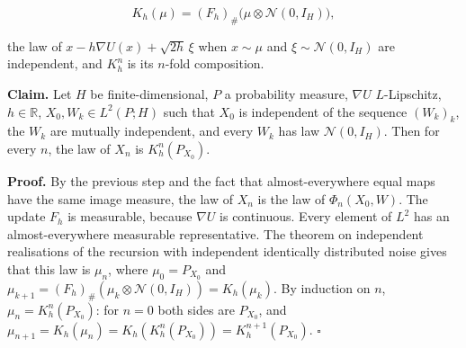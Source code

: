 \documentclass[11pt,a4paper]{article}
\begin{document}
\[K_h(\mu)=(F_h)_\#\bigl(\mu\otimes\mathcal N(0,I_H)\bigr),\]


the law of \(x-h\nabla U(x)+\sqrt{2h}\,\xi\) when \(x\sim\mu\) and \(\xi\sim\mathcal N(0,I_H)\) are independent, and \(K_h^n\) is its \(n\)-fold composition.




\textbf{Claim.} Let \(H\) be finite-dimensional, \(P\) a probability measure, \(\nabla U\) \(L\)-Lipschitz, \(h\in\mathbb R\), \(X_0,W_k\in L^2(P;H)\) such that \(X_0\) is independent of the sequence \((W_k)_k\), the \(W_k\) are mutually independent, and every \(W_k\) has law \(\mathcal N(0,I_H)\). Then for every \(n\), the law of \(X_n\) is \(K_h^n(P_{X_0})\).




\textbf{Proof.} By the previous step and the fact that almost-everywhere equal maps have the same image measure, the law of \(X_n\) is the law of \(\Phi_n(X_0,W)\). The update \(F_h\) is measurable, because \(\nabla U\) is continuous. Every element of \(L^2\) has an almost-everywhere measurable representative. The theorem on independent realisations of the recursion with independent identically distributed noise \cite[Section~3.33.12]{LangevinLean2026ULASC} gives that this law is \(\mu_n\), where \(\mu_0=P_{X_0}\) and \(\mu_{k+1}=(F_h)_\#(\mu_k\otimes\mathcal N(0,I_H))=K_h(\mu_k)\). By induction on \(n\), \(\mu_n=K_h^n(P_{X_0})\): for \(n=0\) both sides are \(P_{X_0}\), and \(\mu_{n+1}=K_h(\mu_n)=K_h(K_h^n(P_{X_0}))=K_h^{n+1}(P_{X_0})\). \(\square\)
\end{document}
